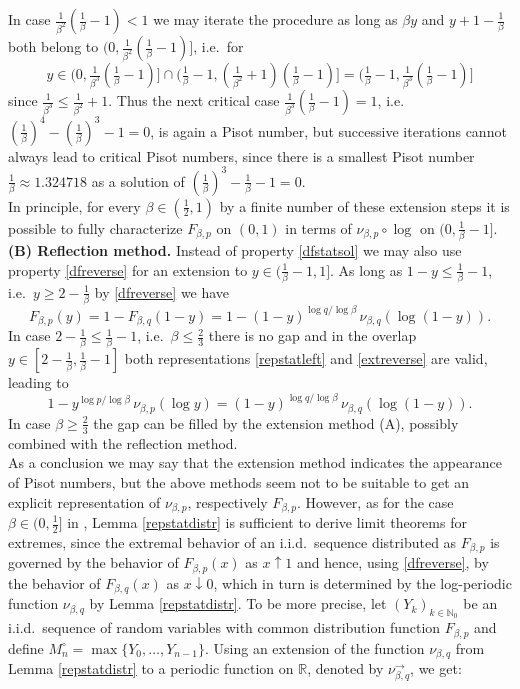\documentclass[12pt]{amsart}
\theoremstyle{definition}
\theoremstyle{remark}
\newcommand{\rr}{{\mathbb R}}
\newcommand{\nat}{{\mathbb N}}
\numberwithin{equation}{section}
\begin{document}
In case $\frac1{\beta^2}(\frac1{\beta}-1)<1$ we may iterate the procedure as long as $\beta y$ and $y+1-\tfrac1{\beta}$ both belong to $(0,\frac1{\beta^{2}}(\frac1{\beta}-1)]$, i.e.\ for
$$y\in(0,\tfrac1{\beta^3}(\tfrac1{\beta}-1)]\cap(\tfrac1{\beta}-1,(\tfrac1{\beta^{2}}+1)(\tfrac1{\beta}-1) ]=(\tfrac1{\beta}-1,\tfrac1{\beta^3}(\tfrac1{\beta}-1)]$$
since $\frac1{\beta^3}\leq\frac1{\beta^{2}}+1$. Thus the next critical case $\frac1{\beta^3}(\frac1{\beta}-1)=1$, i.e.\ $(\frac1{\beta})^4-(\frac1{\beta})^3-1=0$, is again a Pisot number, but successive iterations cannot always lead to critical Pisot numbers, since there is a smallest Pisot number $\frac1\beta\approx 1.324718$ as a solution of $(\frac1{\beta})^3-\frac1{\beta}-1=0$.\\
In principle, for every $\beta\in(\frac12,1)$ by a finite number of these extension steps it is possible to fully characterize $F_{\beta,p}$ on $(0,1)$ in terms of $\nu_{\beta,p}\circ\log$ on  $(0,\frac1\beta-1]$.\\

{\bf (B) Reflection method.}
Instead of property \eqref{dfstatsol} we may also use property \eqref{dfreverse} for an extension to $y\in(\frac1{\beta}-1,1]$. As long as $1-y\leq\frac1{\beta}-1$, i.e.\ $y\geq 2-\frac1{\beta}$ by \eqref{dfreverse} we have
\begin{equation}\label{extreverse}
F_{\beta,p}(y) = 1-F_{\beta,q}(1-y)=1-(1-y)^{\log q/\log\beta}\,\nu_{\beta,q}(\log(1-y)).
\end{equation}
In case $2-\frac1{\beta}\leq \frac1{\beta}-1$, i.e.\ $\beta\leq\frac23$ there is no gap and in the overlap $y\in[2-\frac1{\beta},\frac1{\beta}-1]$ both representations \eqref{repstatleft} and \eqref{extreverse} are valid, leading to
$$1-y^{\log p/\log\beta}\,\nu_{\beta,p}(\log y)=(1-y)^{\log q/\log\beta}\,\nu_{\beta,q}(\log(1-y)).$$
In case $\beta\geq\frac23$ the gap can be filled by the extension method (A), possibly combined with the reflection method.\\

As a conclusion we may say that the extension method indicates the appearance of Pisot numbers, but the above methods seem not to be suitable to get an explicit representation of $\nu_{\beta,p}$, respectively $F_{\beta,p}$. However, as for the case $\beta\in(0,\frac12]$ in \cite{Sterk}, Lemma \ref{repstatdistr} is sufficient to derive limit theorems for extremes, since the extremal behavior of an i.i.d.\ sequence distributed as $F_{\beta,p}$ is governed by the behavior of $F_{\beta,p}(x)$ as $x\uparrow1$ and hence, using \eqref{dfreverse}, by the behavior of $F_{\beta,q}(x)$ as $x\downarrow0$, which in turn is determined by the log-periodic function $\nu_{\beta,q}$ by Lemma \ref{repstatdistr}. To be more precise, let $(Y_{k})_{k\in\nat_{0}}$ be an i.i.d.\ sequence of random variables with common distribution function $F_{\beta,p}$ and define
$M_{n}^{\circ}=\max\{Y_{0},\ldots,Y_{n-1}\}$. Using an extension of the function $\nu_{\beta,q}$ from Lemma \ref{repstatdistr} to a periodic function on $\rr$, denoted by  $\nu_{\beta,q}^{\to}$, we get:
\end{document}
